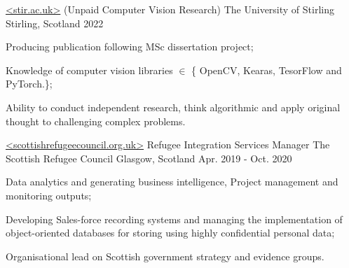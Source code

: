 

\begin{cventries}

  \cventry
    {\href{https://www.stir.ac.uk}{<stir.ac.uk>}\vspace{-5pt} \newline  (Unpaid Computer Vision Research) } %
    {The University of Stirling\vspace{-9pt}} %
    {Stirling, Scotland} %
    {2022} %
    {
      \begin{cvitems} %
        \item {Producing publication following MSc dissertation project;}
        \item {Knowledge of computer vision libraries $\in$ \{ OpenCV, Kearas, TesorFlow and PyTorch.\};}
        \item {Ability to conduct independent research, think algorithmic and apply original thought to challenging complex problems.}
      \end{cvitems}
    }

  \cventry
    {\href{https://www.scottishrefugeecouncil.org.uk/}{<scottishrefugeecouncil.org.uk>}\vspace{-5pt} \newline Refugee Integration Services Manager } %
    {The Scottish Refugee Council\vspace{-9pt}} %
    {Glasgow, Scotland} %
    {Apr. 2019 - Oct. 2020} %
    {
      \begin{cvitems} %
        \item {Data analytics and generating business intelligence, Project management and monitoring outputs;}
        \item {Developing Sales-force recording systems and managing the implementation of object-oriented databases for storing using highly confidential personal data;}
        \item {Organisational lead on Scottish government strategy and evidence groups. }
      \end{cvitems}
    }


\end{cventries}
